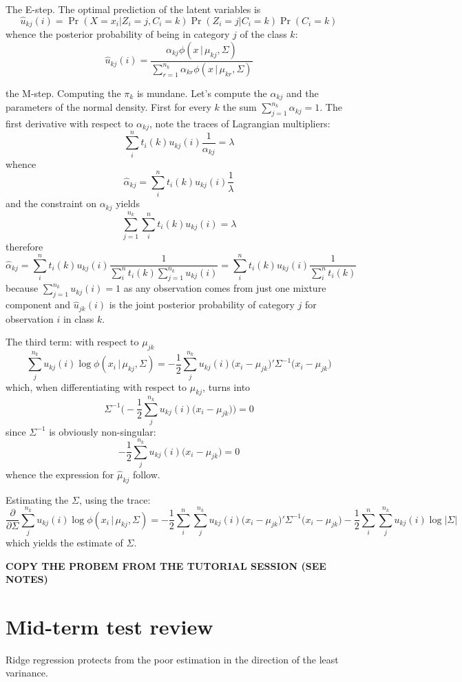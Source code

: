 \documentclass[a4paper]{article}
\begin{document}
The E-step. The optimal prediction of the latent variables is
\[\hat{u}_{kj}(i) = \Pr(X=x_i\lvert Z_i=j, C_i = k) \Pr(Z_i=j\lvert C_i = k) \Pr(C_i = k)\]
whence the posterior probability of being in category $j$ of the class $k$:
\[\hat{u}_{kj}(i) = \frac{\alpha_{kj} \phi(x\,\lvert\,\mu_{kj}, \Sigma)}{\sum_{r=1}^{n_k} \alpha_{kr} \phi(x\,\lvert\,\mu_{kr}, \Sigma) }\]

the M-step. Computing the $\pi_k$ is mundane. Let's compute the $\alpha_{kj}$ and the parameters of the normal density.
First for every $k$ the sum $\sum_{j=1}^{n_k}\alpha_{kj} = 1$. The first derivative with respect to $\alpha_{kj}$, note the traces of Lagrangian multipliers:
\[ \sum_i^n t_i(k) u_{kj}(i) \frac{1}{\alpha_{kj}} = \lambda\]
whence 
\[\hat{\alpha}_{kj} = \sum_i^n t_i(k) u_{kj}(i) \frac{1}{\lambda} \]
and the constraint on $\alpha_{kj}$ yields
\[\sum_{j=1}^{n_k} \sum_i^n t_i(k) u_{kj}(i) = \lambda \]
therefore
\[\hat{\alpha}_{kj}
= \sum_i^n t_i(k) u_{kj}(i) \frac{1}{\sum_i^n t_i(k) \sum_{j=1}^{n_k} u_{kj}(i)}
= \sum_i^n t_i(k) u_{kj}(i) \frac{1}{ \sum_i^n t_i(k) } \]
because $\sum_{j=1}^{n_k} u_{kj}(i) = 1$ as any observation comes from just one mixture component
and $\hat{u}_{jk}(i)$ is the joint posterior probability of category $j$ for observation $i$ in class $k$.

The third term: with respect to $\mu_{jk}$
\[\sum_j^{n_k} u_{kj}(i) \log \phi(x_i\,\lvert\,\mu_{kj}, \Sigma)
= - \frac{1}{2} \sum_j^{n_k} u_{kj}(i) \big(x_i - \mu_{jk}\big)'\Sigma^{-1}\big(x_i - \mu_{jk}\big)\]
which, when differentiating with respect to $\mu_{kj}$, turns into
\[ \Sigma^{-1}\Big( - \frac{1}{2} \sum_j^{n_k} u_{kj}(i) \big(x_i - \mu_{jk}\big) \Big) = 0\]
since $\Sigma^{-1}$ is obviously non-singular:
\[ - \frac{1}{2} \sum_j^{n_k} u_{kj}(i) \big(x_i - \mu_{jk}\big) = 0\]
whence the expression for $\hat{\mu}_{kj}$ follow.

Estimating the $\Sigma$, using the trace:
\[\frac{\partial }{\partial \Sigma} \sum_j^{n_k} u_{kj}(i) \log \phi(x_i\,\lvert\,\mu_{kj}, \Sigma)
= - \frac{1}{2} \sum_i^n \sum_j^{n_k} u_{kj}(i) \big(x_i - \mu_{jk}\big)'\Sigma^{-1}\big(x_i - \mu_{jk}\big)
-\frac{1}{2} \sum_i^n \sum_j^{n_k} u_{kj}(i) \log \lvert \Sigma\rvert\]
which yields the estimate of $\Sigma$.

\textbf{COPY THE PROBEM FROM THE TUTORIAL SESSION (SEE NOTES)}



\section{Mid-term test review} %
\label{sec:mid_term_test_review}
Ridge regression protects from the poor estimation in the direction of the least varinance.
\end{document}
